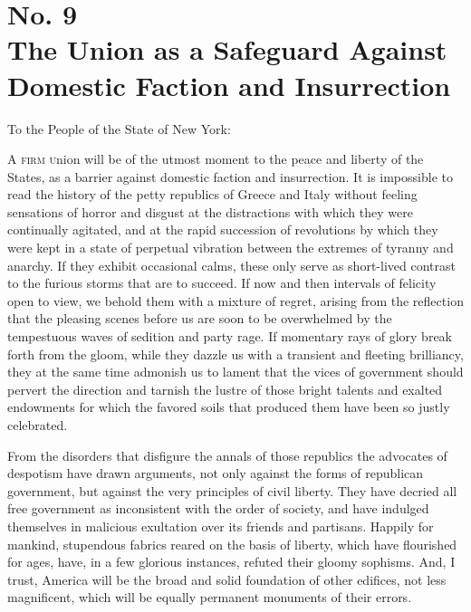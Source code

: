 \chapter[No. 9: The Union as a Safeguard Against Domestic Faction and Insurrection]{No. 9\\ {\small The Union as a Safeguard Against Domestic Faction and Insurrection}}
To the People of the State of New York:
\vspace{.4cm}

\textsc{A firm u}nion will be of the utmost moment to the peace and liberty of the States, as a barrier against domestic faction and insurrection. It is impossible to read the history of the petty republics of Greece and Italy without feeling sensations of horror and disgust at the distractions with which they were continually agitated, and at the rapid succession of revolutions by which they were kept in a state of perpetual vibration between the extremes of tyranny and anarchy. If they exhibit occasional calms, these only serve as short-lived contrast to the furious storms that are to succeed. If now and then intervals of felicity open to view, we behold them with a mixture of regret, arising from the reflection that the pleasing scenes before us are soon to be overwhelmed by the tempestuous waves of sedition and party rage. If momentary rays of glory break forth from the gloom, while they dazzle us with a transient and fleeting brilliancy, they at the same time admonish us to lament that the vices of government should pervert the direction and tarnish the lustre of those bright talents and exalted endowments for which the favored soils that produced them have been so justly celebrated.

From the disorders that disfigure the annals of those republics the advocates of despotism have drawn arguments, not only against the forms of republican government, but against the very principles of civil liberty. They have decried all free government as inconsistent with the order of society, and have indulged themselves in malicious exultation over its friends and partisans. Happily for mankind, stupendous fabrics reared on the basis of liberty, which have flourished for ages, have, in a few glorious instances, refuted their gloomy sophisms. And, I trust, America will be the broad and solid foundation of other edifices, not less magnificent, which will be equally permanent monuments of their errors.

